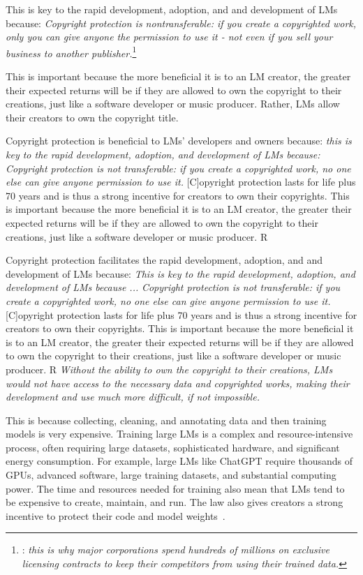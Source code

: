 \documentclass{article} %
\begin{document}
This is key to the rapid development, adoption, and and development of LMs because:
    \emph{ Copyright protection is nontransferable: if you create a copyrighted work, only you can give anyone the permission to use it - not even if you sell your business to another publisher.}\footnote{\citet{carlini2023extracting}: \emph{this is why major corporations spend hundreds of millions on exclusive licensing contracts to keep their competitors from using their trained data.}
}

This is important because the more beneficial it is to an LM creator, the greater their expected returns will be if they are allowed to own the copyright to their creations, just like a software developer or music producer.
Rather, LMs allow their creators to own the copyright title.

Copyright protection is beneficial to LMs' developers and owners because:    \emph{this is key to the rapid development, adoption, and development of LMs because:}
    \emph{Copyright protection is not transferable: if you create a copyrighted work, no one else can give anyone permission to use it.} [C]opyright protection lasts for life plus 70 years and is thus a strong incentive for creators to own their copyrights. This is important because the more beneficial it is to an LM creator, the greater their expected returns will be if they are allowed to own the copyright to their creations, just like a software developer or music producer. R

Copyright protection facilitates the rapid development, adoption, and and development of LMs because:    \emph{This is key to the rapid development, adoption, and development of LMs because ...} \emph{Copyright protection is not transferable: if you create a copyrighted work, no one else can give anyone permission to use it.} [C]opyright protection lasts for life plus 70 years and is thus a strong incentive for creators to own their copyrights. This is important because the more beneficial it is to an LM creator, the greater their expected returns will be if they are allowed to own the copyright to their creations, just like a software developer or music producer. R
\emph{Without the ability to own the copyright to their creations, LMs would not have access to the necessary data and copyrighted works, making their development and use much more difficult, if not impossible.}

This is because collecting, cleaning, and annotating data and then training models is very expensive.
Training large LMs is a complex and resource-intensive process, often requiring large datasets, sophisticated hardware, and significant energy consumption.
For example, large LMs like ChatGPT require thousands of GPUs, advanced software, large training datasets, and substantial computing power.
The time and resources needed for training also mean that LMs tend to be expensive to create, maintain, and run.
The law also gives creators a strong incentive to protect their code and model weights~\citep{henderson2023foundation, lemley2020fair}.
\end{document}
